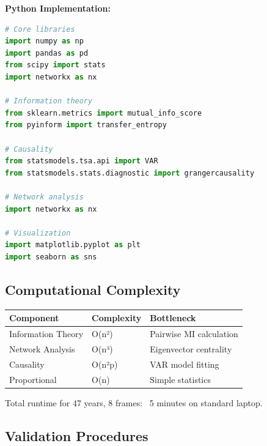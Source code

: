 \documentclass[11pt]{article}
\begin{document}
\textbf{Python Implementation:}
\begin{lstlisting}[language=Python]
# Core libraries
import numpy as np
import pandas as pd
from scipy import stats
import networkx as nx

# Information theory
from sklearn.metrics import mutual_info_score
from pyinform import transfer_entropy

# Causality
from statsmodels.tsa.api import VAR
from statsmodels.stats.diagnostic import grangercausality

# Network analysis
import networkx as nx

# Visualization
import matplotlib.pyplot as plt
import seaborn as sns
\end{lstlisting}

\subsection{Computational Complexity}

\begin{center}
\begin{tabular}{lll}
\toprule
\textbf{Component} & \textbf{Complexity} & \textbf{Bottleneck} \\
\midrule
Information Theory & O(n²) & Pairwise MI calculation \\
Network Analysis & O(n³) & Eigenvector centrality \\
Causality & O(n²p) & VAR model fitting \\
Proportional & O(n) & Simple statistics \\
\bottomrule
\end{tabular}
\end{center}

Total runtime for 47 years, 8 frames: ~5 minutes on standard laptop.

\subsection{Validation Procedures}
\end{document}
